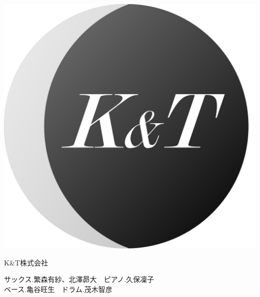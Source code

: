 \documentclass[a4paper]{article}
\begin{document}
\begin{minipage}{0.25\textheight}
    \flushleft
    \includegraphics[width=0.25\textheight]{./FULLHOUSE/resources/9.jpg}
\end{minipage}
\begin{minipage}{\textwidth - 0.25\textheight}
    \flushleft
    \Huge \vspace{1em}K\&T株式会社\vspace{1em}\normalsize \\
    \begin{minipage}{15em}
        \flushleft
        \Large
        サックス.繁森有紗、北澤昴大　ピアノ.久保凜子\\ベース.亀谷旺生　ドラム.茂木智彦
    \end{minipage}
    \begin{minipage}{\textwidth - 18em}
        \flushleft
        \large

    \end{minipage}
\end{minipage}
\end{document}

